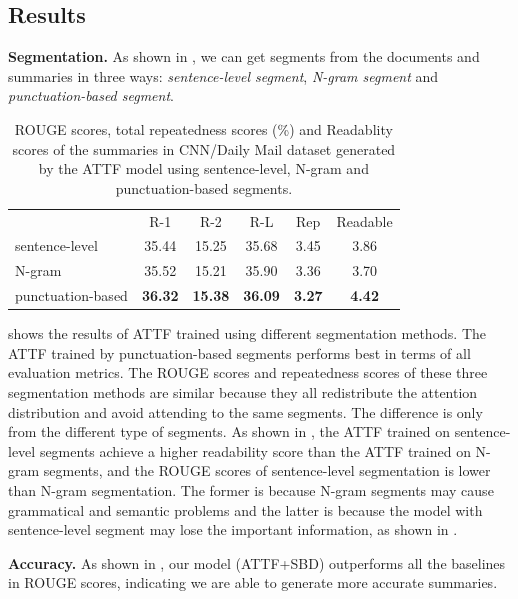 \subsection{Results}
\label{sec:result}

\textbf{Segmentation.} As shown in , we can get segments from the documents and summaries in three ways: {\em sentence-level segment}, {\em N-gram segment} and {\em punctuation-based segment}.
\begin{table}[th!]
	\begin{center}
		\caption{ROUGE scores, total repeatedness scores (\%) and Readablity scores of the summaries in CNN/Daily Mail dataset generated by the ATTF model using sentence-level, N-gram and punctuation-based segments.}
		\begin{tabular}{lccccc}
			\toprule[1pt]
			&   R-1 & R-2 & R-L & Rep & Readable \\
			\cmidrule[1pt]{1-6}
			sentence-level &  35.44 & 15.25 & 35.68 & 3.45 &3.86\\
			N-gram &  35.52 & 15.21 & 35.90 & 3.36 &3.70 \\
			punctuation-based & \bf 36.32 & \bf 15.38 &  \bf 36.09 & \bf 3.27 &\bf 4.42 \\
			\bottomrule[1pt]
		\end{tabular}
		\label{tab:seg_comp}
	\end{center}
\end{table}

  shows the results of ATTF trained using different segmentation methods. 
The ATTF trained by punctuation-based segments performs best in terms of all evaluation metrics. The ROUGE scores and repeatedness scores of these three segmentation methods are similar because they all redistribute the attention distribution and avoid attending to the same segments. The difference is only from the different type of segments. As shown in , 
the ATTF trained on sentence-level segments achieve a higher readability score than the ATTF trained on N-gram segments, and the ROUGE scores of sentence-level segmentation is lower than N-gram segmentation. The former is because N-gram segments may cause grammatical and semantic problems and the latter is because the model with sentence-level segment may lose the important information, as shown in .



\textbf{Accuracy.} As shown in , 
our model (ATTF+SBD) outperforms all the baselines in ROUGE scores, 
indicating we are able to generate more
accurate summaries. 

